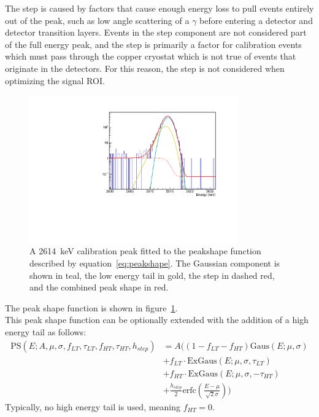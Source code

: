 \documentclass[/main.tex]{subfiles}
\begin{document}
The step is caused by factors that cause enough energy loss to pull events entirely out of the peak, such as low angle scattering of a $\gamma$ before entering a detector and detector transition layers.
Events in the step component are not considered part of the full energy peak, and the step is primarily a factor for calibration events which must pass through the copper cryostat which is not true of events that originate in the detectors.
For this reason, the step is not considered when optimizing the signal ROI.
\begin{figure}
  \centering
  \includegraphics[width=0.8\textwidth]{peakshape}
  \caption[Peak shape function]{\label{fig:peakshape}
    A 2614~keV calibration peak fitted to the peakshape function described by equation~\ref{eq:peakshape}. The Gaussian component is shown in teal, the low energy tail in gold, the step in dashed red, and the combined peak shape in red.
  }
\end{figure}
The peak shape function is shown in figure~\ref{fig:peakshape}.
\\
This peak shape function can be optionally extended with the addition of a high energy tail as follows:
\begin{equation}
  \begin{aligned}
    \mathrm{PS}(E; A, \mu, \sigma, f_{LT}, \tau_{LT}, f_{HT}, \tau_{HT}, h_{step}) &= A\big((1-f_{LT}-f_{HT})\mathrm{Gaus}(E; \mu, \sigma) \\&+ f_{LT}\cdot\mathrm{ExGaus}(E; \mu, \sigma, \tau_{LT}) \\&+ f_{HT}\cdot\mathrm{ExGaus}(E; \mu, \sigma, -\tau_{HT}) \\&+ \frac{h_{step}}{2}\mathrm{erfc}(\frac{E-\mu}{\sqrt{2}\sigma})\big)
  \end{aligned}
\end{equation}
Typically, no high energy tail is used, meaning $f_{HT}=0$.
\end{document}
